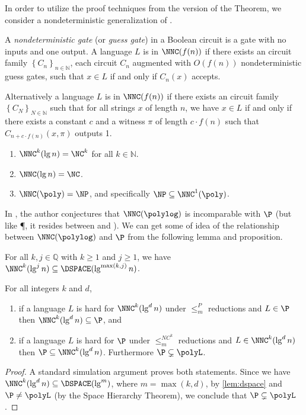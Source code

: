 \documentclass[]{article}
\begin{document}
In order to utilize the proof techniques from the \NP{} version of the \PCP{} Theorem, we consider a nondeterministic generalization of \NC.
\begin{definition}
  A \emph{nondeterministic gate} (or \emph{guess gate}) in a Boolean circuit is a gate with no inputs and one output.
  A language $L$ is in $\NNC(f(n))$ if there exists an \NC{} circuit family $\left\{C_n\right\}_{n \in \mathbb{N}}$, each circuit $C_n$ augmented with $O(f(n))$ nondeterministic guess gates, such that $x \in L$ if and only if $C_n(x)$ accepts.

  Alternatively a language $L$ is in $\NNC(f(n))$ if there exists an \NC{} circuit family $\left\{C_N\right\}_{N \in \mathbb{N}}$ such that for all strings $x$ of length $n$, we have $x \in L$ if and only if there exists a constant $c$ and a witness $\pi$ of length $c \cdot f(n)$ such that $C_{n + c \cdot f(n)}(x, \pi)$ outputs 1.
\end{definition}

\begin{proposition}\label{prop:nnc}
  \mbox{}
  \begin{enumerate}
  \item $\NNC^k(\lg n) = \NC^k$ for all $k \in \mathbb{N}$.
  \item $\NNC(\lg n) = \NC$.
  \item $\NNC(\poly) = \NP$, and specifically $\NP \subseteq \NNC^1(\poly)$.
  \end{enumerate}
\end{proposition}

In \cite{wolf94}, the author conjectures that $\NNC(\polylog)$ is incomparable with $\P$ (but like \P, it resides between \NC{} and \NP).
We can get some of idea of the relationship between $\NNC(\polylog)$ and $\P$ from the following lemma and proposition.

\begin{lemma}\label{lem:dspace}
  For all $k, j \in \mathbb{Q}$ with $k \geq 1$ and $j \geq 1$, we have $\NNC^k(\lg^j n) \subseteq \DSPACE(\lg^{\max(k, j)} n)$.
\end{lemma}

\begin{proposition}
  For all integers $k$ and $d$,
  \begin{enumerate}
  \item if a language $L$ is hard for $\NNC^k(\lg^d n)$ under $\leq_m^P$ reductions and $L \in \P$ then $\NNC^k(\lg^d n) \subseteq \P$, and
  \item if a language $L$ is hard for $\P$ under $\leq_m^{NC^k}$ reductions and $L \in \NNC^k(\lg^d n)$ then $\P \subseteq \NNC^k(\lg^d n)$.
    Furthermore $\P \subsetneq \polyL$.
  \end{enumerate}
\end{proposition}
\begin{proof}
  A standard simulation argument proves both statements.
  Since we have $\NNC^k(\lg^d n) \subseteq \DSPACE(\lg^m)$, where $m = \max(k, d)$, by \autoref{lem:dspace} and $\P \neq \polyL$ (by the Space Hierarchy Theorem), we conclude that $\P \subsetneq \polyL$.
\end{proof}
\end{document}

